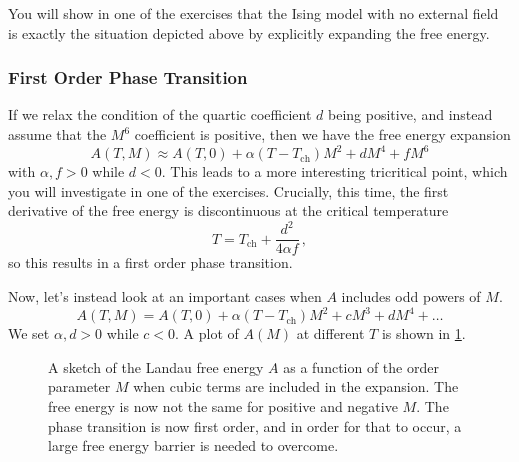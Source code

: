 \documentclass{article}
\theoremstyle{plain}\theoremheaderfont{\normalfont\bfseries}\theorembodyfont{\rmfamily}\theoremseparator{.}\newtheorem*{thm}{Theorem}\newtheorem*{law}{Law}\newtheorem*{pos}{Postulate}
\numberwithin{equation}{section}
\begin{document}
    You will show in one of the exercises that the Ising model with no external field is exactly the situation depicted above by explicitly expanding the free energy.
    \subsubsection{First Order Phase Transition}
    If we relax the condition of the quartic coefficient \(d\) being positive, and instead assume that the \(M^6\) coefficient is positive, then we have the free energy expansion
    \begin{equation}
        A(T,M)\approx A(T,0)+\alpha(T-T_{\text{ch}})M^2+dM^4+fM^6
    \end{equation}
    with \(\alpha,f>0\) while \(d<0\). This leads to a more interesting tricritical point, which you will investigate in one of the exercises. Crucially, this time, the first derivative of the free energy is discontinuous at the critical temperature
    \begin{equation}
        T=T_{\text{ch}}+\frac{d^2}{4\alpha f}\,,
    \end{equation}
    so this results in a first order phase transition.

    Now, let's instead look at an important cases when \(A\) includes odd powers of \(M\).
    \begin{equation}
        A(T,M)=A(T,0)+\alpha(T-T_{\text{ch}})M^2+cM^3+dM^4+\dots
    \end{equation}
    We set \(\alpha,d>0\) while \(c<0\). A plot of \(A(M)\) at different \(T\) is shown in \cref{odd_Landau}.
    \begin{figure}
        \centering
        \caption{A sketch of the Landau free energy \(A\) as a function of the order parameter \(M\) when cubic terms are included in the expansion. The free energy is now not the same for positive and negative \(M\). The phase transition is now first order, and in order for that to occur, a large free energy barrier is needed to overcome.}
        \label{odd_Landau}
    \end{figure}
\end{document}
